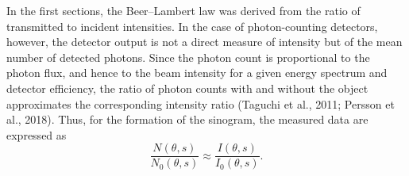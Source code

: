 \documentclass[12pt,a4paper]{article}
\begin{document}
\newline\newline
In the first sections, the Beer–Lambert law was derived from the ratio of transmitted to incident intensities. In the case of photon-counting detectors, however, the detector output is not a direct measure of intensity but of the mean number of detected photons. Since the photon count is proportional to the photon flux, and hence to the beam intensity for a given energy spectrum and detector efficiency, the ratio of photon counts with and without the object approximates the corresponding intensity ratio (Taguchi et al., 2011; Persson et al., 2018). Thus, for the formation of the sinogram, the measured data are expressed as
\begin{equation}
    \frac{N(\theta, s)}{N_0(\theta, s)} \approx \frac{I(\theta, s)}{I_0(\theta, s)}.
\end{equation}
\end{document}
